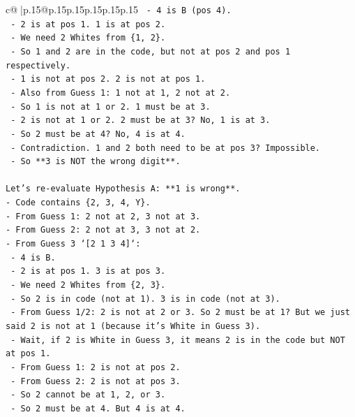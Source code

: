 \documentclass{article}
\begin{document}
{\begin{supertabular}{c@{$\;$}|p{.15\linewidth}@{}p{.15\linewidth}p{.15\linewidth}p{.15\linewidth}p{.15\linewidth}p{.15\linewidth}}
{{{\texttt{        {-} 4 is B (pos 4).} \\
\texttt{        {-} 2 is at pos 1. 1 is at pos 2.} \\
\texttt{        {-} We need 2 Whites from \{1, 2\}.} \\
\texttt{        {-} So 1 and 2 are in the code, but not at pos 2 and pos 1 respectively.} \\
\texttt{        {-} 1 is not at pos 2. 2 is not at pos 1.} \\
\texttt{        {-} Also from Guess 1: 1 not at 1, 2 not at 2.} \\
\texttt{        {-} So 1 is not at 1 or 2. 1 must be at 3.} \\
\texttt{        {-} 2 is not at 1 or 2. 2 must be at 3? No, 1 is at 3.} \\
\texttt{        {-} So 2 must be at 4? No, 4 is at 4.} \\
\texttt{        {-} Contradiction. 1 and 2 both need to be at pos 3? Impossible.} \\
\texttt{        {-} So **3 is NOT the wrong digit**.} \\
\\ 
\texttt{Let's re{-}evaluate Hypothesis A: **1 is wrong**.} \\
\texttt{{-} Code contains \{2, 3, 4, Y\}.} \\
\texttt{{-} From Guess 1: 2 not at 2, 3 not at 3.} \\
\texttt{{-} From Guess 2: 2 not at 3, 3 not at 2.} \\
\texttt{{-} From Guess 3 `{[}2 1 3 4{]}`:} \\
\texttt{  {-} 4 is B.} \\
\texttt{  {-} 2 is at pos 1. 3 is at pos 3.} \\
\texttt{  {-} We need 2 Whites from \{2, 3\}.} \\
\texttt{  {-} So 2 is in code (not at 1). 3 is in code (not at 3).} \\
\texttt{  {-} From Guess 1/2: 2 is not at 2 or 3. So 2 must be at 1? But we just said 2 is not at 1 (because it's White in Guess 3).} \\
\texttt{  {-} Wait, if 2 is White in Guess 3, it means 2 is in the code but NOT at pos 1.} \\
\texttt{  {-} From Guess 1: 2 is not at pos 2.} \\
\texttt{  {-} From Guess 2: 2 is not at pos 3.} \\
\texttt{  {-} So 2 cannot be at 1, 2, or 3.} \\
\texttt{  {-} So 2 must be at 4. But 4 is at 4.} \\
}}}
\end{supertabular}}
\end{document}
